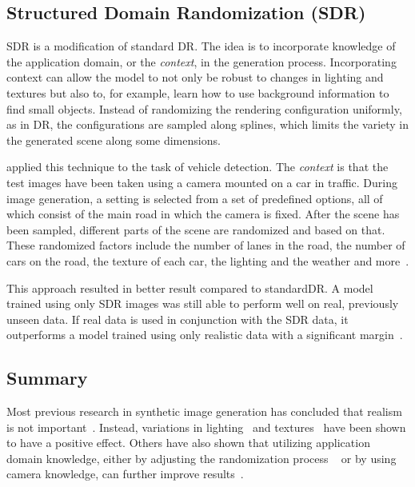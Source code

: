 \subsection{Structured Domain Randomization (SDR)}
\Gls{SDR} is a modification of standard \gls{DR}. The idea is to incorporate knowledge of the application domain, or the \textit{context}, in the generation process. Incorporating context can allow the model to not only be robust to changes in lighting and textures but also to, for example, learn how to use background information to find small objects. Instead of randomizing the rendering configuration uniformly, as in \gls{DR}, the configurations are sampled along splines, which limits the variety in the generated scene along some dimensions. 

\textcite{structureddomainrandomization} applied this technique to the task of vehicle detection. The \textit{context} is that the test images have been taken using a camera mounted on a car in traffic. During image generation, a setting is selected from a set of predefined options, all of which consist of the main road in which the camera is fixed. After the scene has been sampled, different parts of the scene are randomized and based on that. These randomized factors include the number of lanes in the road, the number of cars on the road, the texture of each car, the lighting and the weather and more~\cite{structureddomainrandomization}.

This approach resulted in better result compared to standard\gls{DR}. A model trained using only \gls{SDR} images was still able to perform well on real, previously unseen data. If real data is used in conjunction with the \gls{SDR} data, it outperforms a model trained using only realistic data with a significant margin~\cite{structureddomainrandomization}. 

\subsection{Summary}
Most previous research in synthetic image generation has concluded that realism is not important~\cite{domainrand, domainrandcars, object-detection-synth, goodsynthetic}. Instead, variations in lighting~\cite{goodsynthetic, domainrand, domainrandcars} and textures~\cite{domainrand, domainrandcars} have been shown to have a positive effect. Others have also shown that utilizing application domain knowledge, either by adjusting the randomization process ~\cite{structureddomainrandomization} or by using camera knowledge, can further improve results~\cite{goodsynthetic}.

